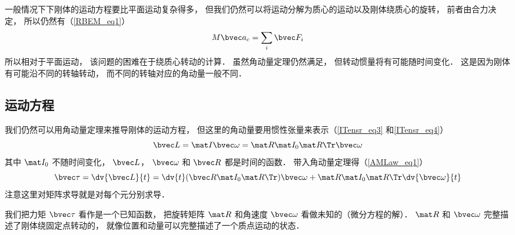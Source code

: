 

一般情况下下刚体的运动方程要比平面运动复杂得多， 但我们仍然可以将运动分解为质心的运动以及刚体绕质心的旋转， 前者由合力决定， 所以仍然有（\autoref{RBEM_eq1}）
\begin{equation}
M\bvec a_c = \sum_i \bvec F_i
\end{equation}
所以相对于平面运动， 该问题的困难在于绕质心转动的计算． 虽然角动量定理仍然满足， 但转动惯量将有可能随时间变化． 这是因为刚体有可能沿不同的转轴转动， 而不同的转轴对应的角动量一般不同．


\subsection{运动方程}
我们仍然可以用角动量定理来推导刚体的运动方程， 但这里的角动量要用惯性张量来表示（\autoref{ITensr_eq3} 和\autoref{ITensr_eq4}）
\begin{equation}
\bvec L = \mat I \bvec \omega = \mat R \mat I_0 \mat R\Tr \bvec \omega
\end{equation}
其中 $\mat I_0$ 不随时间变化， $\bvec L$， $\bvec \omega$ 和 $\bvec R$ 都是时间的函数． 带入角动量定理得（\autoref{AMLaw_eq1}）
\begin{equation}\label{RBEqM_eq3}
\bvec \tau = \dv{\bvec L}{t} = \dv{t} (\bvec R\mat I_0 \mat R\Tr) \bvec \omega + \mat R \mat I_0 \mat R\Tr \dv{\bvec \omega}{t}
\end{equation}
注意这里对矩阵求导就是对每个元分别求导．

我们把力矩 $\bvec \tau$ 看作是一个已知函数， 把旋转矩阵 $\mat R$ 和角速度 $\bvec \omega$ 看做未知的（微分方程的解）． $\mat R$ 和 $\bvec \omega$ 完整描述了刚体绕固定点转动的， 就像位置和动量可以完整描述了一个质点运动的状态．

